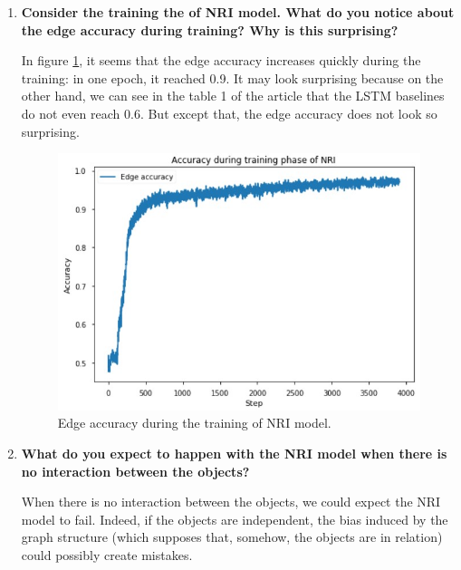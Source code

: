 \documentclass[a4paper, 11pt]{article}
\begin{document}
\begin{enumerate}
	\item \textbf{Consider the training the of NRI model. What do you notice about the edge accuracy during training? Why is this surprising?}
	
	In figure \ref{fig:q6-edge-acc}, it seems that the edge accuracy increases quickly during the training: in one epoch, it reached 0.9. It may look surprising because on the other hand, we can see in the table 1 of the article that the LSTM baselines do not even reach $0.6$. But except that, the edge accuracy does not look so surprising.
	
	\pagebreak
	
	\begin{figure}
	    \centering
	    \includegraphics[scale=.8]{images/q6_edge_acc.jpg}
	    \caption{Edge accuracy during the training of NRI model.}
	    \label{fig:q6-edge-acc}
	\end{figure}
	
	\item \textbf{What do you expect to happen with the NRI model when there is no interaction between the objects?}
	
	When there is no interaction between the objects, we could expect the NRI model to fail. Indeed, if the objects are independent, the bias induced by the graph structure (which supposes that, somehow, the objects are in relation) could possibly create mistakes.
\end{enumerate}
\end{document}
